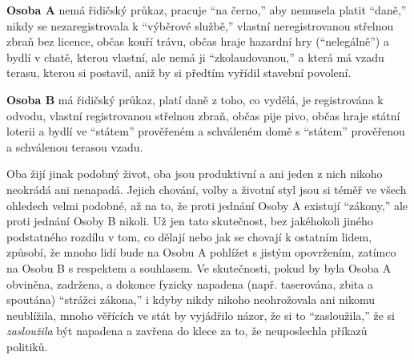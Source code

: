 \documentclass{book}
\begin{document}
\textbf{Osoba A} nemá řidičský průkaz, pracuje \enquote{na černo,} aby nemusela platit \enquote{daně,} nikdy se nezaregistrovala k \enquote{výběrové službě,} vlastní neregistrovanou střelnou zbraň bez licence, občas kouří trávu, občas hraje hazardní hry (\enquote{nelegálně}) a bydlí v chatě, kterou vlastní, ale nemá ji \enquote{zkolaudovanou,} a která má vzadu terasu, kterou si postavil, aniž by si předtím vyřídil stavební povolení.

\textbf{Osoba B} má řidičský průkaz, platí daně z toho, co vydělá, je registrována k odvodu, vlastní registrovanou střelnou zbraň, občas pije pivo, občas hraje státní loterii a bydlí ve \enquote{státem} prověřeném a schváleném domě s \enquote{státem} prověřenou a schválenou terasou vzadu.

Oba žijí jinak podobný život, oba jsou produktivní a ani jeden z nich nikoho neokrádá ani nenapadá. Jejich chování, volby a životní styl jsou si téměř ve všech ohledech velmi podobné, až na to, že proti jednání Osoby A existují \enquote{zákony,} ale proti jednání Osoby B nikoli. Už jen tato skutečnost, bez jakéhokoli jiného podstatného rozdílu v tom, co dělají nebo jak se chovají k ostatním lidem, způsobí, že mnoho lidí bude na Osobu A pohlížet s jistým opovržením, zatímco na Osobu B s respektem a souhlasem. Ve skutečnosti, pokud by byla Osoba A obviněna, zadržena, a dokonce fyzicky napadena (např. taserována, zbita a spoutána) \enquote{strážci zákona,} i kdyby nikdy nikoho neohrožovala ani nikomu neublížila, mnoho věřících ve stát by vyjádřilo názor, že si to \enquote{zasloužila,} že si \emph{zasloužila} být napadena a zavřena do klece za to, že neuposlechla příkazů politiků.
\end{document}

